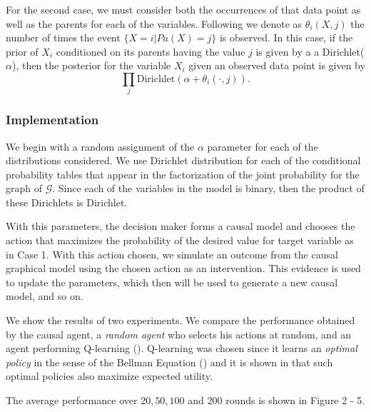 \documentclass[english,letterpaper,12pt,final]{article}
\theoremstyle{definition}
\begin{document}
For the second case, we must consider both the occurrences of that data point as well as the parents for each of the variables. Following \cite{barber2012bayesian} we denote as $\theta_i(X,j)$ the number of times the event $\{X=i | Pa(X)=j\}$ is observed. In this case, if the prior of $X_i$ conditioned on its parents having the value $j$ is given by a a Dirichlet($\alpha$), then the posterior for the variable $X_i$ given an observed data point is given by 
\[ \prod_j \textrm{Dirichlet}(\alpha + \theta_i(\cdot,j)). \]

\subsubsection{Implementation}
We begin with a random assignment of the $\alpha$ parameter for each of the distributions considered. We use Dirichlet distribution for each of the conditional probability tables that appear in the factorization of the joint probability for the graph of $\mathcal{G}$. Since each of the variables in the model is binary, then the product of these Dirichlets is Dirichlet.

With this parameters, the decision maker forms a causal model and chooses the action that maximizes the probability of the desired value for target variable as in Case 1.  With this action chosen, we simulate an outcome from the causal graphical model using the chosen action as an intervention. This evidence is used to update the parameters, which then will be used to generate a new causal model, and so on.

We show the results of two experiments. We compare the performance obtained by the causal agent, a \textit{random agent} who selects his actions at random, and an agent performing Q-learning (\cite{watkins1992q}). Q-learning was chosen since it learns an \textit{optimal policy} in the sense of the Bellman Equation (\cite{sutton1998reinforcement}) and it is shown in \cite{webb2007game} that such optimal policies also maximize expected utility. 

The average performance over $20, 50, 100$ and $200$ rounds is shown in Figure 2 - 5.
\end{document}
